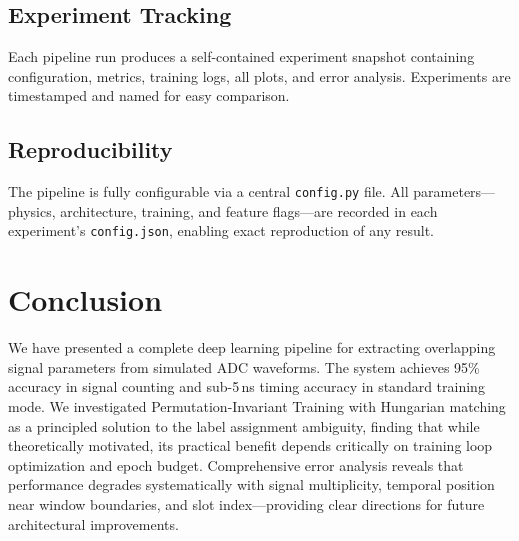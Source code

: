 \documentclass[11pt,twocolumn]{article}
\begin{document}
\subsection{Experiment Tracking}

Each pipeline run produces a self-contained experiment snapshot containing configuration, metrics, training logs, all plots, and error analysis.
Experiments are timestamped and named for easy comparison.

\subsection{Reproducibility}

The pipeline is fully configurable via a central \texttt{config.py} file.
All parameters---physics, architecture, training, and feature flags---are recorded in each experiment's \texttt{config.json}, enabling exact reproduction of any result.

\section{Conclusion}
\label{sec:conclusion}

We have presented a complete deep learning pipeline for extracting overlapping signal parameters from simulated ADC waveforms.
The system achieves 95\% accuracy in signal counting and sub-5\,ns timing accuracy in standard training mode.
We investigated Permutation-Invariant Training with Hungarian matching as a principled solution to the label assignment ambiguity, finding that while theoretically motivated, its practical benefit depends critically on training loop optimization and epoch budget.
Comprehensive error analysis reveals that performance degrades systematically with signal multiplicity, temporal position near window boundaries, and slot index---providing clear directions for future architectural improvements.
\end{document}

